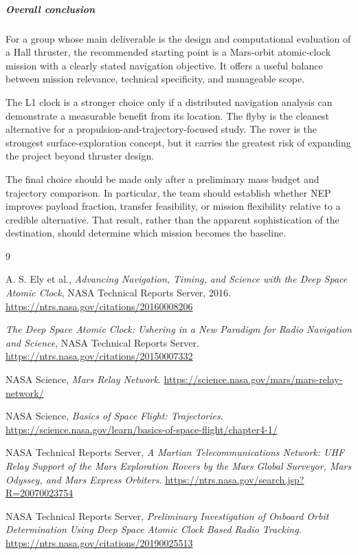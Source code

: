 \subparagraph{Overall conclusion}

For a group whose main deliverable is the design and
computational evaluation of a Hall thruster, the recommended
starting point is a Mars-orbit atomic-clock mission with a
clearly stated navigation objective. It offers a useful
balance between mission relevance, technical specificity,
and manageable scope.

The L1 clock is a stronger choice only if a distributed
navigation analysis can demonstrate a measurable benefit
from its location. The flyby is the cleanest alternative
for a propulsion-and-trajectory-focused study. The rover
is the strongest surface-exploration concept, but it carries
the greatest risk of expanding the project beyond thruster
design.

The final choice should be made only after a preliminary
mass budget and trajectory comparison. In particular, the
team should establish whether NEP improves payload fraction,
transfer feasibility, or mission flexibility relative to
a credible alternative. That result, rather than the
apparent sophistication of the destination, should determine
which mission becomes the baseline.

\begin{thebibliography}{9}

	A. S. Ely et al.,
	\textit{Advancing Navigation, Timing, and Science with the
		Deep Space Atomic Clock},
	NASA Technical Reports Server, 2016.
	\url{https://ntrs.nasa.gov/citations/20160008206}

	\textit{The Deep Space Atomic Clock: Ushering in a New Paradigm
		for Radio Navigation and Science},
	NASA Technical Reports Server.
	\url{https://ntrs.nasa.gov/citations/20150007332}

	NASA Science,
	\textit{Mars Relay Network}.
	\url{https://science.nasa.gov/mars/mars-relay-network/}

	NASA Science,
	\textit{Basics of Space Flight: Trajectories}.
	\url{https://science.nasa.gov/learn/basics-of-space-flight/chapter4-1/}

	NASA Technical Reports Server,
	\textit{A Martian Telecommunications Network: UHF Relay Support
		of the Mars Exploration Rovers by the Mars Global Surveyor,
		Mars Odyssey, and Mars Express Orbiters}.
	\url{https://ntrs.nasa.gov/search.jsp?R=20070023754}

	NASA Technical Reports Server,
	\textit{Preliminary Investigation of Onboard Orbit Determination
		Using Deep Space Atomic Clock Based Radio Tracking}.
	\url{https://ntrs.nasa.gov/citations/20190025513}

\end{thebibliography}



